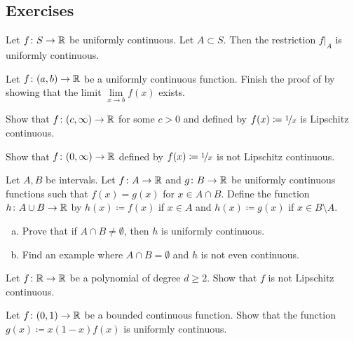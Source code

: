 \subsection{Exercises}

\begin{exercise}
Let $f \colon S \to {\mathbb{R}}$ be uniformly continuous.  Let $A \subset S$.
Then the restriction $f|_A$ is uniformly continuous.
\end{exercise}

\begin{exercise}
Let $f \colon (a,b) \to {\mathbb{R}}$ be a uniformly continuous function.
Finish the proof of  by showing that
the limit
$\lim\limits_{x \to b} f(x)$
exists.
\end{exercise}

\begin{exercise}
Show that $f \colon (c,\infty) \to {\mathbb{R}}$ for some $c > 0$
and defined by $f(x) \coloneqq \nicefrac{1}{x}$ is Lipschitz continuous.
\end{exercise}

\begin{exercise}
Show that $f \colon (0,\infty) \to {\mathbb{R}}$
defined by $f(x) \coloneqq \nicefrac{1}{x}$ is not Lipschitz continuous.
\end{exercise}

\begin{samepage}
\begin{exercise}
Let $A, B$ be intervals.
Let $f \colon A \to {\mathbb{R}}$ and $g \colon B \to {\mathbb{R}}$ be uniformly continuous
functions such that $f(x) = g(x)$ for $x \in A \cap B$.  Define
the function $h \colon A \cup B \to {\mathbb{R}}$ by $h(x) \coloneqq f(x)$ if
$x \in A$ and $h(x) \coloneqq g(x)$ if $x \in B \setminus A$.
\begin{enumerate}[a)]
\item
Prove that if $A \cap B \neq \emptyset$, then $h$ is uniformly continuous.
\item
Find an example where $A \cap B = \emptyset$ and $h$ is not even
continuous.
\end{enumerate}
\end{exercise}
\end{samepage}

\begin{exercise}[Challenging]
Let $f \colon {\mathbb{R}} \to {\mathbb{R}}$ be a polynomial of degree 
$d \geq 2$.  Show that $f$ is not Lipschitz
continuous.
\end{exercise}

\begin{exercise}
Let $f \colon (0,1) \to {\mathbb{R}}$ be a bounded continuous function.  Show that
the function
$g(x) \coloneqq x(1-x)f(x)$ is uniformly continuous.
\end{exercise}

